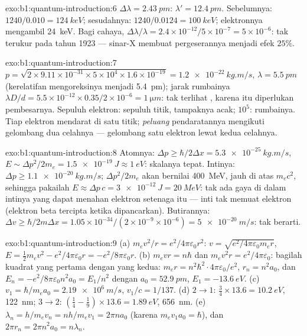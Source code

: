 \begin{solution}{exo:b1:quantum-introduction:6}
$\Delta\lambda = \qty{2.43}{pm}$: $\lambda' = \qty{12.4}{pm}$. Sebelumnya: $1240/0.010 =
\qty{124}{keV}$; sesudahnya: $1240/0.0124 = \qty{100}{keV}$; elektronnya mengambil
\qty{24}{keV}. Bagi cahaya, $\Delta\lambda/\lambda = 2.4 \times 10^{-12}/5 \times 10^{-7} = 5 \times
10^{-6}$: tak terukur pada tahun 1923 --- sinar-X membuat pergeserannya menjadi efek $25\%$.
\end{solution}

\begin{solution}{exo:b1:quantum-introduction:7}
$p = \sqrt{2 \times 9.11 \times 10^{-31} \times 5 \times 10^4 \times 1.6 \times 10^{-19}} =
\qty{1.2e-22}{kg.m/s}$, $\lambda = \qty{5.5}{pm}$ (kerelatifan mengoreksinya menjadi
\qty{5.4}{pm}); jarak rumbainya $\lambda D/d = 5.5 \times 10^{-12} \times 0.35/2 \times 10^{-6}
= \qty{1}{\micro m}$: tak terlihat , karena itu diperlukan  pembesarnya. Sepuluh
elektron: sepuluh titik, tampaknya acak; $10^5$: rumbainya. Tiap
elektron mendarat di satu titik; \emph{peluang} pendaratannya mengikuti
gelombang dua celahnya --- gelombang satu elektron lewat kedua celahnya.
\end{solution}

\begin{solution}{exo:b1:quantum-introduction:8}
Atomnya: $\Delta p \geq \hbar/2\Delta x = \qty{5.3e-25}{kg.m/s}$, $E \sim \Delta p^2/2m_e =
\qty{1.5e-19}{J} \approx \qty{1}{eV}$: skalanya tepat. Intinya: $\Delta p \geq
\qty{1.1e-20}{kg.m/s}$; $\Delta p^2/2m_e$ akan bernilai \qty{400}{MeV}, jauh di atas
$m_ec^2$, sehingga pakailah $E \approx \Delta p\,c = \qty{3e-12}{J} = \qty{20}{MeV}$: tak ada gaya
di dalam intinya yang dapat menahan elektron setenaga itu --- inti tak memuat
elektron (elektron beta tercipta ketika dipancarkan). Butirannya: $\Delta v \geq
\hbar/2m\Delta x = 1.05 \times 10^{-34}/(2 \times 10^{-9} \times 10^{-6}) = \qty{5e-20}{m/s}$:
tak berarti.
\end{solution}

\begin{solution}{exo:b1:quantum-introduction:9}
(a) $m_ev^2/r = e^2/4\pi\varepsilon_0r^2$: $v = \sqrt{e^2/4\pi\varepsilon_0m_er}$, $E =
\tfrac12m_ev^2 - e^2/4\pi\varepsilon_0r = -e^2/8\pi\varepsilon_0r$. (b) $m_evr = n\hbar$ dan
$m_ev^2r = e^2/4\pi\varepsilon_0$: bagilah kuadrat yang pertama dengan yang kedua:
$m_er = n^2\hbar^2 \cdot 4\pi\varepsilon_0/e^2$, $r_n = n^2a_0$, dan $E_n = -e^2/8\pi\varepsilon_0n^2a_0
= E_1/n^2$ dengan $a_0 = \qty{52.9}{pm}$, $E_1 = \qty{-13.6}{eV}$. (c) $v_1 =
\hbar/m_ea_0 = \qty{2.19e6}{m/s}$, $v_1/c = 1/137$. (d) $2 \to 1$: $\tfrac34 \times
13.6 = \qty{10.2}{eV}$, \qty{122}{nm}; $3 \to 2$: $(\tfrac14 - \tfrac19) \times 13.6 =
\qty{1.89}{eV}$, \qty{656}{nm}. (e) $\lambda_n = h/m_ev_n = nh/m_ev_1 = 2\pi na_0$
(karena $m_ev_1a_0 = \hbar$), dan $2\pi r_n = 2\pi n^2a_0 = n\lambda_n$.
\end{solution}

